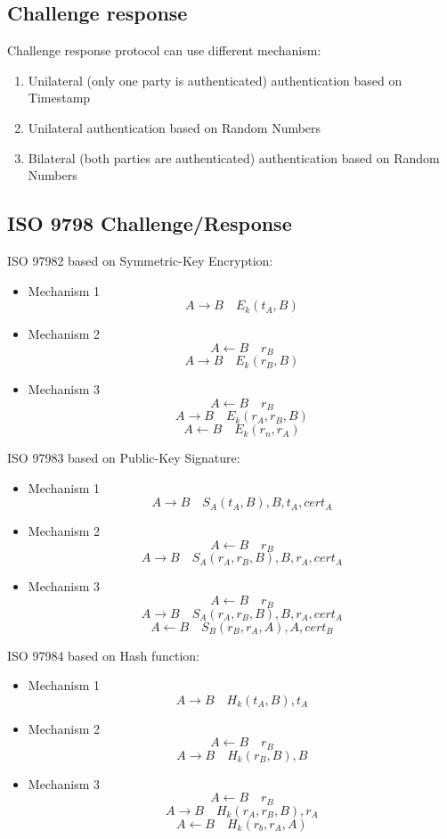 \subsection{Challenge response}
Challenge response protocol can use different mechanism:
\begin{enumerate}
    \item Unilateral (only one party is authenticated) authentication based on Timestamp
    \item Unilateral authentication based on Random Numbers
    \item Bilateral (both parties are authenticated) authentication based on Random Numbers
\end{enumerate}

\subsection{ISO 9798 Challenge/Response}
ISO 9798\text{-}2 based on Symmetric-Key Encryption:
\begin{itemize}
    \item Mechanism 1
    		$$ A  \rightarrow B \quad E_k(t_A,B) $$
    \item Mechanism 2
    		$$ A  \leftarrow  B \quad r_B $$
    		$$ A  \rightarrow B \quad E_k(r_B,B) $$
    \item Mechanism 3
    		$$ A  \leftarrow B \quad r_B $$
    		$$ A  \rightarrow B \quad E_k(r_A,r_B,B) $$
    		$$ A  \leftarrow  B \quad E_k(r_n,r_A) $$
\end{itemize}
ISO 9798\text{-}3 based on Public-Key Signature:
\begin{itemize}
    \item Mechanism 1
    $$ A \rightarrow B \quad S_A(t_A,B),B,t_A,cert_A $$
    \item Mechanism 2
    $$ A \leftarrow B \quad r_B$$
    $$ A \rightarrow B \quad S_A(r_A,r_B,B),B,r_A,cert_A $$
    \item Mechanism 3
    $$ A \leftarrow B \quad r_B $$
    $$ A \rightarrow B \quad S_A(r_A,r_B,B),B,r_A,cert_A $$
    $$ A \leftarrow B \quad S_B(r_B,r_A,A),A,cert_B $$
\end{itemize}

ISO 9798\text{-}4 based on Hash function:
\begin{itemize}
    \item Mechanism 1
    $$ A \rightarrow B \quad H_k(t_A,B),t_A $$
    \item Mechanism 2
    $$ A \leftarrow B \quad r_B $$
    $$ A \rightarrow B \quad H_k(r_B,B),B $$
    \item Mechanism 3
    $$ A \leftarrow B \quad r_B $$
    $$ A \rightarrow B \quad H_k(r_A,r_B,B),r_A $$
    $$ A \leftarrow B \quad H_k(r_b,r_A,A) $$
\end{itemize}
